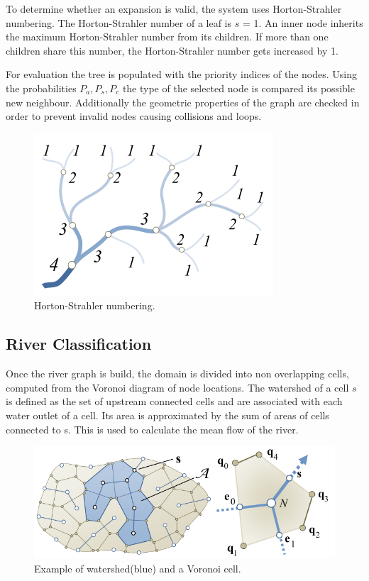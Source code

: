 To determine whether an expansion is valid, the system uses Horton-Strahler numbering. The Horton-Strahler number of a leaf  is $s$ = 1. An inner node inherits the maximum Horton-Strahler number from its children. If more than one children share this number, the Horton-Strahler number gets increased by 1.

For evaluation the tree is populated with the priority indices of the nodes. Using the probabilities  $P_a, P_s, P_c$ the type of the selected node is compared its possible new neighbour. Additionally the geometric properties of the graph are checked in order to prevent invalid nodes causing collisions and loops.  
\begin{figure}[htb]
	\centering
	\includegraphics[width=0.5\linewidth]{GGG13/horton-strahler}
	\caption{Horton-Strahler numbering.}
	\label{fig:horton_strahler}
\end{figure}

\subsection{River Classification}
Once the river graph is build, the domain is divided into non overlapping cells, computed from the Voronoi diagram of node locations.  
The watershed of a cell $s$ is defined as the set of upstream connected cells and are associated with each water outlet of a cell. Its area is approximated by the sum of areas of cells connected to s. This is used to calculate the mean flow of the river. 

\begin{figure}[htb]
	\centering
	\includegraphics[width=\linewidth]{GGG13/voronoi_watershed}
	\caption{Example of watershed(blue) and a Voronoi cell.}
	\label{fig:voronoi_watershed}
\end{figure}

